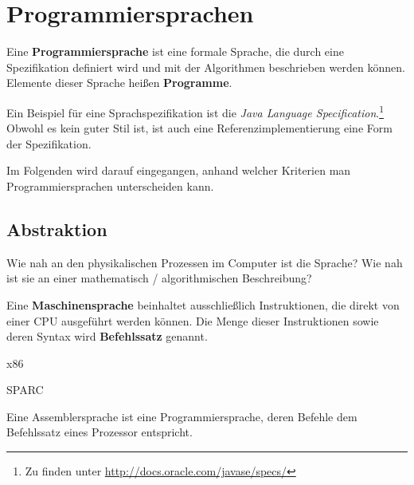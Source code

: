 \chapter{Programmiersprachen}
\begin{definition}%
    Eine \textbf{Programmiersprache} ist eine formale Sprache, die durch eine
    Spezifikation definiert wird und mit der Algorithmen beschrieben werden
    können. Elemente dieser Sprache heißen \textbf{Programme}.
\end{definition}

Ein Beispiel für eine Sprachspezifikation ist die \textit{Java Language Specification}.\footnote{Zu finden unter \url{http://docs.oracle.com/javase/specs/}} Obwohl es kein guter Stil ist, ist auch
eine Referenzimplementierung eine Form der Spezifikation.

Im Folgenden wird darauf eingegangen, anhand welcher Kriterien man
Programmiersprachen unterscheiden kann.

\section{Abstraktion}
Wie nah an den physikalischen Prozessen im Computer ist die Sprache?
Wie nah ist sie an einer mathematisch / algorithmischen Beschreibung?

\begin{definition}%
    Eine \textbf{Maschinensprache} beinhaltet ausschließlich Instruktionen, die direkt
    von einer CPU ausgeführt werden können. Die Menge dieser Instruktionen
    sowie deren Syntax wird \textbf{Befehlssatz} genannt.
\end{definition}

\begin{beispiel}[Maschinensprachen]
    \begin{bspenum}
        \item {}x86
        \item {}SPARC
    \end{bspenum}
\end{beispiel}

\begin{definition}[Assembler]%
    Eine Assemblersprache ist eine Programmiersprache, deren Befehle dem
    Befehlssatz eines Prozessor entspricht.
\end{definition}


